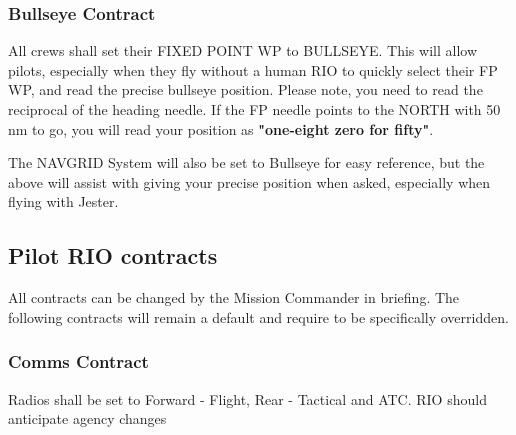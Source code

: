 \subsubsection{Bullseye Contract}
\label{subsubsec:contract-bullseye}

All crews shall set their FIXED POINT WP to BULLSEYE. This will allow pilots,
especially when they fly without a human RIO to quickly select their FP WP, and
read the precise bullseye position. Please note, you need to read the
reciprocal of the heading needle. If the FP needle points to the NORTH with 50
nm to go, you will read your position as \textbf{"one-eight zero for fifty"}.

The NAVGRID System will also be set to Bullseye for easy reference, but the
above will assist with giving your precise position when asked, especially when
flying with Jester.

\subsection{Pilot RIO contracts}

All contracts can be changed by the Mission Commander in briefing. The
following contracts will remain a default and require to be specifically
overridden.

\newpage

\subsubsection{Comms Contract}

Radios shall be set to Forward - Flight, Rear - Tactical and ATC. RIO should
anticipate agency changes

